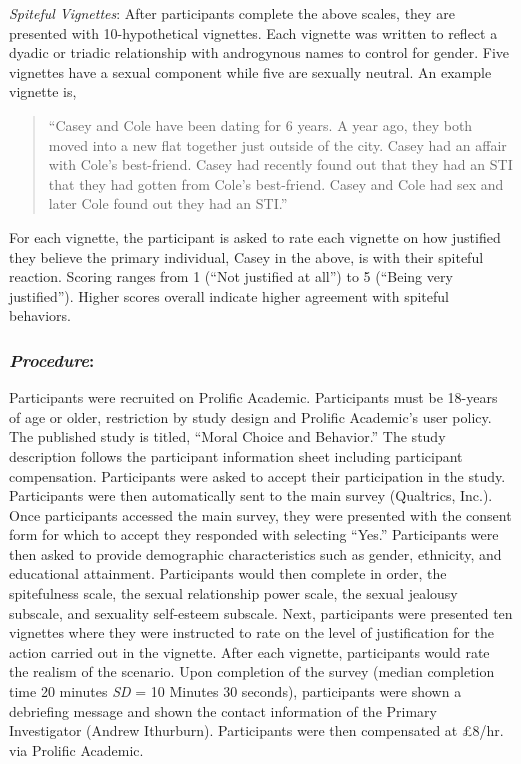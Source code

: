 \documentclass[
  english,
  a4paper]{apa7}
\begin{document}
\emph{Spiteful Vignettes}:
After participants complete the above scales, they are presented with 10-hypothetical vignettes. Each vignette was written to reflect a dyadic or triadic relationship with androgynous names to control for gender. Five vignettes have a sexual component while five are sexually neutral. An example vignette is,

\begin{quote}
``Casey and Cole have been dating for 6 years. A year ago, they both moved into a new flat together just outside of the city. Casey had an affair with Cole's best-friend. Casey had recently found out that they had an STI that they had gotten from Cole's best-friend. Casey and Cole had sex and later Cole found out they had an STI.''
\end{quote}

For each vignette, the participant is asked to rate each vignette on how justified they believe the primary individual, Casey in the above, is with their spiteful reaction. Scoring ranges from 1 (``Not justified at all'') to 5 (``Being very justified''). Higher scores overall indicate higher agreement with spiteful behaviors.

\hypertarget{procedure}{%
\subsubsection{\texorpdfstring{\emph{Procedure}:}{Procedure:}}\label{procedure}}

Participants were recruited on Prolific Academic. Participants must be 18-years of age or older, restriction by study design and Prolific Academic's user policy. The published study is titled, ``Moral Choice and Behavior.'' The study description follows the participant information sheet including participant compensation. Participants were asked to accept their participation in the study. Participants were then automatically sent to the main survey (Qualtrics, Inc.).\\
Once participants accessed the main survey, they were presented with the consent form for which to accept they responded with selecting ``Yes.'' Participants were then asked to provide demographic characteristics such as gender, ethnicity, and educational attainment. Participants would then complete in order, the spitefulness scale, the sexual relationship power scale, the sexual jealousy subscale, and sexuality self-esteem subscale. Next, participants were presented ten vignettes where they were instructed to rate on the level of justification for the action carried out in the vignette. After each vignette, participants would rate the realism of the scenario. Upon completion of the survey (median completion time 20 minutes \emph{SD} = 10 Minutes 30 seconds), participants were shown a debriefing message and shown the contact information of the Primary Investigator (Andrew Ithurburn). Participants were then compensated at £8/hr. via Prolific Academic.
\end{document}
